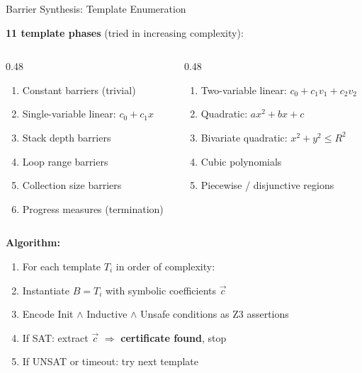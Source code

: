 \documentclass[aspectratio=169]{beamer}
\begin{document}
\begin{frame}{Barrier Synthesis: Template Enumeration}

\textbf{11 template phases} (tried in increasing complexity):

\begin{columns}[T]
\begin{column}{0.48\textwidth}
\begin{enumerate}\setlength\itemsep{0pt}
  \item Constant barriers (trivial)
  \item Single-variable linear: $c_0 + c_1 x$
  \item Stack depth barriers
  \item Loop range barriers
  \item Collection size barriers
  \item Progress measures (termination)
\end{enumerate}
\end{column}
\begin{column}{0.48\textwidth}
\begin{enumerate}\setlength\itemsep{0pt}\setcounter{enumi}{6}
  \item Two-variable linear: $c_0 + c_1 v_1 + c_2 v_2$
  \item Quadratic: $ax^2 + bx + c$
  \item Bivariate quadratic: $x^2 + y^2 \leq R^2$
  \item Cubic polynomials
  \item Piecewise / disjunctive regions
\end{enumerate}
\end{column}
\end{columns}

\vspace{0.5em}
\textbf{Algorithm:}
\begin{enumerate}
  \item For each template $T_i$ in order of complexity:
  \item Instantiate $B = T_i$ with symbolic coefficients $\vec{c}$
  \item Encode Init $\land$ Inductive $\land$ Unsafe conditions as Z3 assertions
  \item If SAT: extract $\vec{c}$ $\Rightarrow$ \textbf{certificate found}, stop
  \item If UNSAT or timeout: try next template
\end{enumerate}

\end{frame}
\end{document}
